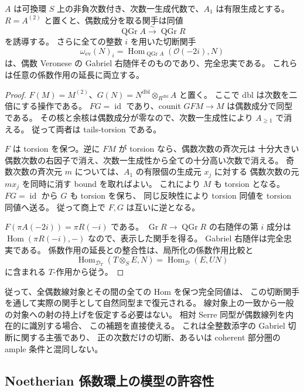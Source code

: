 \begin{lemma}
\label{lem:general-even-gabriel-reconstruction}
$A$ は可換環 $S$ 上の非負次数付き、次数一生成代数で、$A_1$ は有限生成とする。
$R=A^{(2)}$ と置くと、偶数成分を取る関手は同値
\[
 \operatorname{QGr}A\xrightarrow{\sim}\operatorname{QGr}R
\]
を誘導する。
さらに全ての整数 $i$ を用いた切断関手
\[
 \omega_{\mathrm{ev}}(N)_i=
 \operatorname{Hom}_{\operatorname{QGr}A}(\mathcal O(-2i),N)
\]
は、偶数 Veronese の Gabriel 右随伴そのものであり、完全忠実である。
これらは任意の係数作用の延長に両立する。
\end{lemma}

\begin{proof}
$F(M)=M^{(2)}$、$G(N)=N^{\mathrm{dbl}}\otimes_{R^{\mathrm{dbl}}}A$ と置く。
ここで dbl は次数を二倍にする操作である。
$FG=\operatorname{id}$ であり、counit $GFM\to M$ は偶数成分で同型である。
その核と余核は偶数成分が零なので、次数一生成性により $A_{\geq1}$ で消える。
従って両者は tails-torsion である。

$F$ は torsion を保つ。逆に $FM$ が torsion なら、偶数次数の斉次元は
十分大きい偶数次数の右因子で消え、次数一生成性から全ての十分高い次数で消える。
奇数次数の斉次元 $m$ については、$A_1$ の有限個の生成元 $x_j$ に対する
偶数次数の元 $mx_j$ を同時に消す bound を取ればよい。
これにより $M$ も torsion となる。
$FG=\operatorname{id}$ から $G$ も torsion を保ち、
同じ反映性により torsion 同値を torsion 同値へ送る。
従って商上で $F,G$ は互いに逆となる。

$F(\pi A(-2i))=\pi R(-i)$ である。
$\operatorname{Gr}R\to\operatorname{QGr}R$ の右随伴の第 $i$ 成分は
$\operatorname{Hom}(\pi R(-i),-)$ なので、表示した関手を得る。
Gabriel 右随伴は完全忠実である。
係数作用の延長との整合性は、局所化の係数作用比較と
\[
 \operatorname{Hom}_{\mathcal D_T}(T\otimes_SE,N)
   =\operatorname{Hom}_{\mathcal D}(E,UN)
\]
に含まれる $T$-作用から従う。
\end{proof}

\begin{remark}[同値の復元に必要なデータ]
従って、全偶数線対象とその間の全ての Hom を保つ完全同値は、
この切断関手を通して実際の関手として自然同型まで復元される。
線対象上の一致から一般の対象への射の持上げを仮定する必要はない。
相対 Serre 同型が偶数線列を内在的に識別する場合、
この補題を直接使える。
これは全整数添字の Gabriel 切断に関する主張であり、
正の次数だけの切断、あるいは coherent 部分圏の ample 条件と混同しない。
\end{remark}

\subsection{Noetherian 係数環上の模型の許容性}


